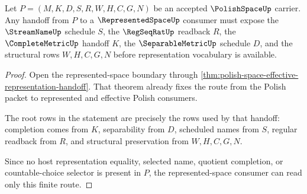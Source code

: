 \begin{theorem}
\label{thm:polishspace-root-representation-handoff}
Let $P=(M,K,D,S,R,W,H,C,G,N)$ be an accepted $\PolishSpaceUp$ carrier. Any handoff from $P$ to a $\RepresentedSpaceUp$ consumer must expose the $\StreamNameUp$ schedule $S$, the $\RegSeqRatUp$ readback $R$, the $\CompleteMetricUp$ handoff $K$, the $\SeparableMetricUp$ schedule $D$, and the structural rows $W,H,C,G,N$ before representation vocabulary is available.
\end{theorem}
\begin{proof}
Open the represented-space boundary through \autoref{thm:polish-space-effective-representation-handoff}. That theorem already fixes the route from the Polish packet to represented and effective Polish consumers.

The root rows in the statement are precisely the rows used by that handoff: completion comes from $K$, separability from $D$, scheduled names from $S$, regular readback from $R$, and structural preservation from $W,H,C,G,N$.

Since no host representation equality, selected name, quotient completion, or countable-choice selector is present in $P$, the represented-space consumer can read only this finite route.
\end{proof}
